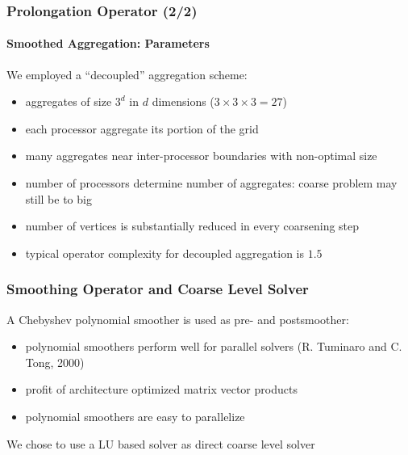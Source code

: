 \documentclass[xcolor=pdftex,table,10pt]{beamer}
\begin{document}
\begin{frame}
	\end{frame}
	
	\begin{frame}
		\frametitle{Prolongation Operator (2/2)}
		\framesubtitle{Smoothed Aggregation: Parameters}
			
			We employed a ``decoupled'' aggregation scheme:
			\vspace{0.2cm}
			\begin{itemize}
				\item aggregates of size $3^d$ in $d$ dimensions ($3 \times 3 \times 3 = 27$)
				\item each processor aggregate its portion of the grid
				\item many aggregates near inter-processor boundaries with non-optimal size
				\item number of processors determine number of aggregates: coarse problem may still be to big
				\item number of vertices is substantially reduced in every coarsening step
				\item typical operator complexity for decoupled aggregation is $1.5$
			\end{itemize}
			

	\end{frame}

	\begin{frame}
		\frametitle{Smoothing Operator and Coarse Level Solver}

		 A Chebyshev polynomial smoother is used as pre- and postsmoother:
		 \begin{itemize}
			 \item polynomial smoothers perform well for parallel solvers (R. Tuminaro and C. Tong, 2000)
			 \item profit of architecture optimized matrix vector products
			 \item polynomial smoothers are easy to parallelize
		\end{itemize}

		\pause
		\vspace{1.2cm}

		We chose to use a LU based solver as direct coarse level solver


	\end{frame}
\end{document}
